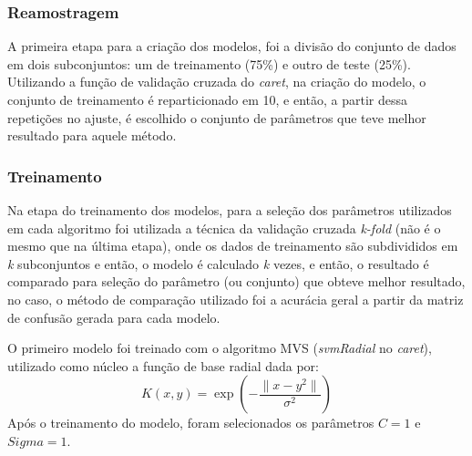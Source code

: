\subsubsection{Reamostragem}\label{reamostragem}

	A primeira etapa para a criação dos modelos, foi a divisão do conjunto
de dados em dois subconjuntos: um de treinamento (75\%) e outro de teste (25\%). Utilizando a função de validação cruzada do \emph{caret}, na criação do modelo, o conjunto de treinamento é reparticionado em 10, e então, a partir dessa repetições no ajuste, é escolhido o conjunto de
parâmetros que teve melhor resultado para aquele método.

\subsubsection{Treinamento}\label{treinamento}

	Na etapa do treinamento dos modelos, para a seleção dos parâmetros
utilizados em cada algoritmo foi utilizada a técnica da validação
cruzada \emph{k-fold} (não é o mesmo que na última etapa), onde os dados de treinamento são subdivididos em \emph{k} subconjuntos e então, o modelo é calculado \emph{k} vezes, e então, o resultado é comparado para seleção do parâmetro (ou conjunto) que obteve melhor resultado, no caso, o método de comparação utilizado foi a acurácia geral a partir da matriz de confusão gerada para cada modelo.

	O primeiro modelo foi treinado com o algoritmo MVS (\emph{svmRadial} no \emph{caret}), utilizado como núcleo a função de base radial dada por: 
    \begin{equation}
	K(x,y) = \exp(-\frac{\parallel x-y^{2} \parallel}{\sigma^{2}})    
    \end{equation}
	Após o treinamento do modelo, foram selecionados os parâmetros $C = 1$ e $Sigma = 1$.
    
